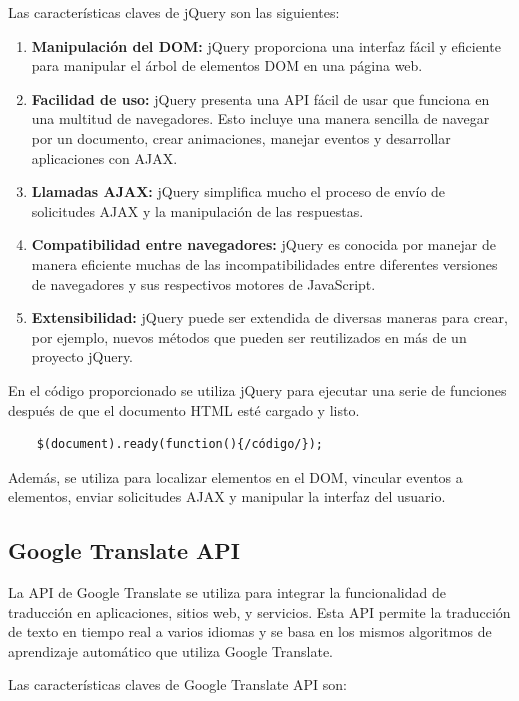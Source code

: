 \documentclass[a4paper, 12pt]{book}
\begin{document}
Las características claves de jQuery son las siguientes:

\begin{enumerate}
  \item \textbf{Manipulación del DOM:} jQuery proporciona una interfaz fácil y eficiente para manipular el árbol de elementos DOM en una página web.
  \item \textbf{Facilidad de uso:} jQuery presenta una API fácil de usar que funciona en una multitud de navegadores. Esto incluye una manera sencilla de navegar por un documento, crear animaciones, manejar eventos y desarrollar aplicaciones con AJAX.
  \item \textbf{Llamadas AJAX:} jQuery simplifica mucho el proceso de envío de solicitudes AJAX y la manipulación de las respuestas.
  \item \textbf{Compatibilidad entre navegadores:} jQuery es conocida por manejar de manera eficiente muchas de las incompatibilidades entre diferentes versiones de navegadores y sus respectivos motores de JavaScript.
  \item \textbf{Extensibilidad:} jQuery puede ser extendida de diversas maneras para crear, por ejemplo, nuevos métodos que pueden ser reutilizados en más de un proyecto jQuery.
\end{enumerate}

En el código proporcionado se utiliza jQuery para ejecutar una serie de funciones después de que el documento HTML esté cargado y listo. 

\begin{verbatim} 
    $(document).ready(function(){/código/});
\end{verbatim}

Además, se utiliza para localizar elementos en el DOM, vincular eventos a elementos, enviar solicitudes AJAX y manipular la interfaz del usuario.

\subsection{Google Translate API}
\label{subsec:google_translate_api}
La API de Google Translate se utiliza para integrar la funcionalidad de traducción en aplicaciones, sitios web, y servicios. Esta API permite la traducción de texto en tiempo 
real a varios idiomas y se basa en los mismos algoritmos de aprendizaje automático que utiliza Google Translate. 

Las características claves de Google Translate API son:
\end{document}
